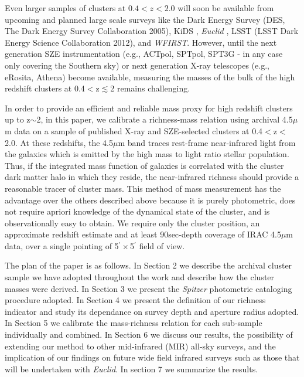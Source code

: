 \documentclass[apj,twocolumn]{emulateapj}
\begin{document}
Even larger samples of clusters at $0.4<z<2.0$ will soon be available from upcoming  and planned  large scale surveys like the Dark Energy Survey (DES, The Dark Energy Survey Collaboration 2005), KiDS \citep{deJong13}, {\it Euclid}
\citep{Laureijs11}, LSST (LSST Dark Energy Science Collaboration 2012), and {\it WFIRST}. However, until the next generation SZE instrumentation (e.g., ACTpol, SPTpol, SPT3G - in any case only covering the Southern sky) or next generation X-ray telescopes (e.g., eRosita, Athena) become available, measuring the masses of the bulk of the high redshift clusters at 0.4$<$z$\lesssim$2 remains challenging. 

In order to provide an efficient and reliable mass proxy for high redshift clusters up to z$\sim $2, in this paper, we calibrate a richness-mass relation using archival 4.5$\mu$m data on a sample
of published X-ray and SZE-selected clusters at 0.4$<$z$<$2.0.  At these redshifts, the 4.5$\mu$m band traces rest-frame near-infrared light from the galaxies which is emitted by the high mass to light ratio stellar population. Thus, if the integrated mass function of galaxies is correlated with the cluster dark matter halo in which they reside, the near-infrared richness should provide a reasonable tracer of cluster mass.
This method of mass measurement has the advantage over the others described above because it is  purely photometric, does not require apriori knowledge of the dynamical state of the cluster, and is observationally easy to obtain. We require only  the cluster position, an approximate redshift estimate and at least 90sec-depth coverage of IRAC 4.5$\mu$m data, over a single pointing of 5$^{\prime}\times$5$^{\prime}$ field of view.

The plan of the paper is as follows. In Section 2 we describe the archival cluster sample we have adopted throughout the work and describe how the cluster masses were derived. In Section 3 we present the {\it Spitzer} photometric cataloging procedure adopted. In Section 4 we present the definition of our richness indicator and study its dependance on survey depth and aperture radius adopted. In Section 5 we calibrate the mass-richness relation for each sub-sample individually and combined. In Section 6 we discuss our results, the possibility of extending our method  to  other mid-infrared (MIR) all-sky surveys, and the implication of our findings on future wide field infrared surveys such as those that will be undertaken with {\it Euclid}. In section 7 we summarize the results.
\end{document}
